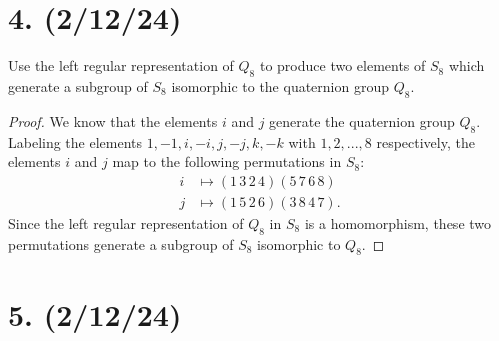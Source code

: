 \documentclass{article}
\begin{document}
\section*{4. (2/12/24)}

Use the left regular representation of $Q_8$ to produce two elements of $S_8$ which generate a subgroup of $S_8$ isomorphic to the quaternion group $Q_8$.

\begin{proof}
    We know that the elements $i$ and $j$ generate the quaternion group $Q_8$. Labeling the elements $1, -1, i, -i, j, -j, k, -k$ with $1, 2, ..., 8$ respectively, the elements $i$ and $j$ map to the following permutations in $S_8$:
    \begin{align*}
        i &\mapsto (1\,3\,2\,4)(5\,7\,6\,8) \\
        j &\mapsto (1\,5\,2\,6)(3\,8\,4\,7).
    \end{align*}
    Since the left regular representation of $Q_8$ in $S_8$ is a homomorphism, these two permutations generate a subgroup of $S_8$ isomorphic to $Q_8$.
\end{proof}

\section*{5. (2/12/24)}
\end{document}
